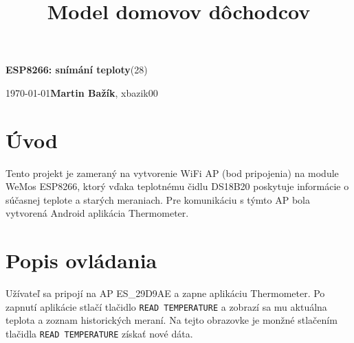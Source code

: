 \documentclass[a4paper, 11pt]{article}
\title{Model domovov dôchodcov}
\begin{document}
\begin{center}
\Large \textbf{ESP8266: snímání teploty}(28)
\end{center}
\noindent
\today \hfill \textbf{Martin Bažík}, xbazik00 \\

\section{Úvod}
Tento projekt je zameraný na vytvorenie WiFi AP (bod pripojenia) na module WeMos ESP8266, ktorý vďaka teplotnému čidlu DS18B20 poskytuje informácie o súčasnej teplote a starých meraniach. Pre komunikáciu s týmto AP bola vytvorená Android aplikácia Thermometer. 

\section{Popis ovládania}
Užívateľ sa pripojí na AP ES\_29D9AE a zapne aplikáciu Thermometer. Po zapnutí aplikácie stlačí tlačidlo \texttt{READ TEMPERATURE} a zobrazí sa mu aktuálna teplota a zoznam historických meraní. Na tejto obrazovke je monžné stlačením tlačidla \texttt{READ TEMPERATURE} získať nové dáta.
\end{document}
